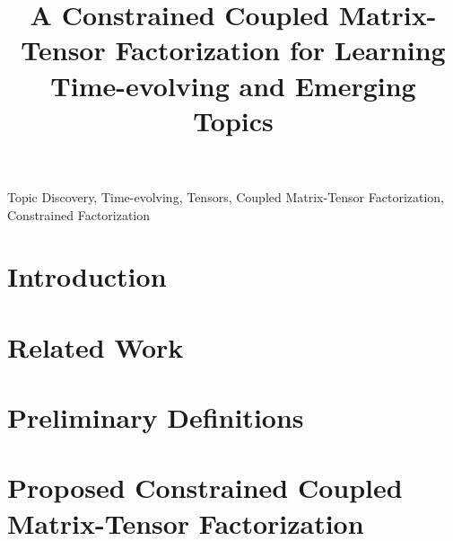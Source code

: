 \documentclass[conference]{IEEEtran}
\begin{document}
\title{A Constrained Coupled Matrix-Tensor Factorization for Learning Time-evolving and Emerging Topics
}

\author{
\and
{}
}

\maketitle

\begin{abstract}

\end{abstract}

\begin{IEEEkeywords}
Topic Discovery, Time-evolving, Tensors, Coupled Matrix-Tensor Factorization, Constrained Factorization
\end{IEEEkeywords}




\section{Introduction}


\section{Related Work} \label{related}


\section{Preliminary Definitions} \label{prelim}


\section{Proposed Constrained Coupled Matrix-Tensor Factorization} \label{problem}

\end{document}
